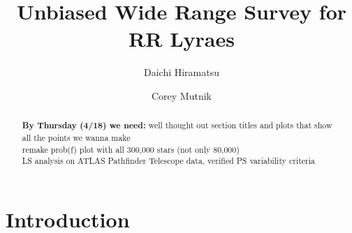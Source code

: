 \documentclass[aps,prb,twocolumn,superscriptaddress]{revtex4-1}
\begin{document}
\title{Unbiased Wide Range Survey for RR Lyraes}


%


\author{Daichi Hiramatsu}
\author{Corey Mutnik}



\begin{abstract}
\textbf{By Thursday (4/18) we need:} well thought out section titles and plots that show all the points we wanna make\\

remake prob(f) plot with all 300,000 stars (not only 80,000)\\

LS analysis on ATLAS Pathfinder Telescope data, verified PS variability criteria
\end{abstract}

\maketitle    




\section{Introduction}

\end{document}
